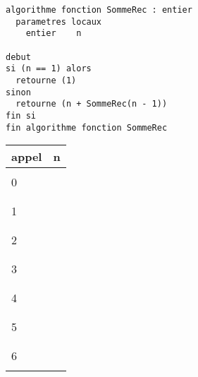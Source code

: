 \documentclass[11pt,a4paper]{article}
\begin{document}
\begin{table}[!ht]
  \centering
  \begin{minipage}{0.45\textwidth}
    \centering
\begin{lstlisting}[style=algorithmique]
algorithme fonction SommeRec : entier
  parametres locaux
    entier    n

debut
si (n == 1) alors
  retourne (1)
sinon
  retourne (n + SommeRec(n - 1))
fin si
fin algorithme fonction SommeRec \end{lstlisting}
  \end{minipage}
  \hfillx
  \begin{minipage}{0.19\textwidth}
    \centering
    \begin{tabular}{|C{1.1cm}|C{1.1cm}|}
        \hline
        appel &  n  \\
        \hline
              &     \\
        0     &     \\
              &     \\
        \hline
              &     \\
        1     &     \\
              &     \\
        \hline
              &     \\
        2     &     \\
              &     \\
        \hline
              &     \\
        3     &     \\
              &     \\
        \hline
              &     \\
        4     &     \\
              &     \\
        \hline
              &     \\
        5     &     \\
              &     \\
        \hline
              &     \\
        6     &     \\
              &     \\
        \hline
    \end{tabular}

\end{minipage}
\end{table}
\end{document}
